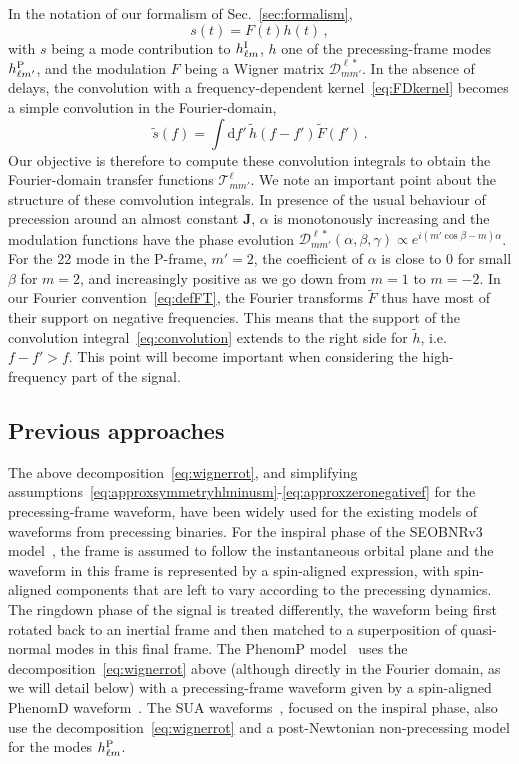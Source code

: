 \documentclass[aps,showpacs,twocolumn,
prd,superscriptaddress,nofootinbib]{revtex4-1}
\newcommand{\be}{\begin{equation}}
\newcommand{\ee}{\end{equation}}
\newcommand\ud{{\mathrm{d}}}
\newcommand\calT{{\mathcal{T}}}
\newcommand\calD{{\mathcal{D}}}
\begin{document}
In the notation of our formalism of Sec.~\ref{sec:formalism}, 
\be\label{eq:defmodulationprec}
	s(t) = F(t) h(t) \,,
\ee
with $s$ being a mode contribution to $h^{\rm I}_{\ell m}$, $h$ one of the precessing-frame modes $h^{\rm P}_{\ell m'}$, and the modulation $F$ being a Wigner matrix $\calD^{\ell *}_{mm'}$. In the absence of delays, the convolution with a frequency-dependent kernel~\eqref{eq:FDkernel} becomes a simple convolution in the Fourier-domain,
\be\label{eq:convolution}
	\tilde{s} (f) = \int \ud f' \, \tilde{h}(f-f') \tilde{F} (f') \,.
\ee
Our objective is therefore to compute these convolution integrals to obtain the Fourier-domain transfer functions $\calT^{\ell}_{mm'}$. We note an important point about the structure of these comvolution integrals. In presence of the usual behaviour of precession around an almost constant $\bm{J}$, $\alpha$ is monotonously increasing and the modulation functions have the phase evolution $\calD^{\ell *}_{mm'} (\alpha, \beta, \gamma) \propto e^{i(m' \cos\beta - m) \alpha}$. For the 22 mode in the P-frame, $m'=2$, the coefficient of $\alpha$ is close to $0$ for small $\beta$ for $m=2$, and increasingly positive as we go down from $m=1$ to $m=-2$. In our Fourier convention~\eqref{eq:defFT}, the Fourier transforms $\tilde{F}$ thus have most of their support on negative frequencies. This means that the support of the convolution integral~\eqref{eq:convolution} extends to the right side for $\tilde{h}$, i.e. $f-f' > f$. This point will become important when considering the high-frequency part of the signal.

\subsection{Previous approaches}
\label{subsec:precpreviousapproaches}

The above decomposition~\eqref{eq:wignerrot}, and simplifying assumptions~\eqref{eq:approxsymmetryhlminusm}-\eqref{eq:approxzeronegativef} for the precessing-frame waveform, have been widely used for the existing models of waveforms from precessing binaries. For the inspiral phase of the SEOBNRv3 model~\cite{Pan+13,BTB16}, the frame is assumed to follow the instantaneous orbital plane and the waveform in this frame is represented by a spin-aligned expression, with spin-aligned components that are left to vary according to the precessing dynamics. The ringdown phase of the signal is treated differently, the waveform being first rotated back to an inertial frame and then matched to a superposition of quasi-normal modes in this final frame. The PhenomP model~\cite{Hannam+13} uses the decomposition~\eqref{eq:wignerrot} above (although directly in the Fourier domain, as we will detail below) with a precessing-frame waveform given by a spin-aligned PhenomD waveform~\cite{Khan+15,Husa+15}. The SUA waveforms~\cite{KCY14,Chatziioannou+16,Chatziioannou+17}, focused on the inspiral phase, also use the decomposition~\eqref{eq:wignerrot} and a post-Newtonian non-precessing model for the modes $h_{\ell m}^{\rm P}$.
\end{document}

